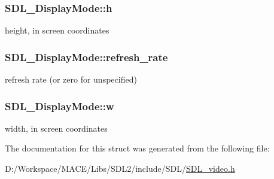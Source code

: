 \subsubsection[{\texorpdfstring{h}{h}}]{ S\+D\+L\+\_\+\+Display\+Mode\+::h}\hypertarget{struct_s_d_l___display_mode_a0d9eabed50a560ed553af772c26632d7}{}\label{struct_s_d_l___display_mode_a0d9eabed50a560ed553af772c26632d7}
height, in screen coordinates 
\subsubsection[{\texorpdfstring{refresh\+\_\+rate}{refresh_rate}}]{ S\+D\+L\+\_\+\+Display\+Mode\+::refresh\+\_\+rate}\hypertarget{struct_s_d_l___display_mode_ad1b5783c9b292ebf24ad4e0e7a98e540}{}\label{struct_s_d_l___display_mode_ad1b5783c9b292ebf24ad4e0e7a98e540}
refresh rate (or zero for unspecified) 
\subsubsection[{\texorpdfstring{w}{w}}]{ S\+D\+L\+\_\+\+Display\+Mode\+::w}\hypertarget{struct_s_d_l___display_mode_a504bb5e21950b719a0df43be51199046}{}\label{struct_s_d_l___display_mode_a504bb5e21950b719a0df43be51199046}
width, in screen coordinates 

The documentation for this struct was generated from the following file\+:\begin{DoxyCompactItemize}
\item 
D\+:/\+Workspace/\+M\+A\+C\+E/\+Libs/\+S\+D\+L2/include/\+S\+D\+L/\hyperlink{_s_d_l__video_8h}{S\+D\+L\+\_\+video.\+h}\end{DoxyCompactItemize}
